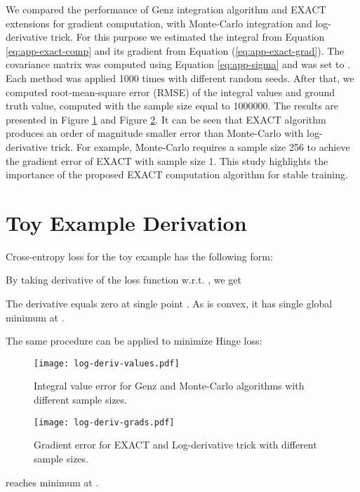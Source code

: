 \documentclass[nohyperref]{article}
\theoremstyle{plain}
\theoremstyle{definition}
\theoremstyle{remark}
\begin{document}
We compared the performance of Genz integration algorithm \cite{genz1992numerical} and EXACT extensions for gradient computation, with Monte-Carlo integration and log-derivative trick. For this purpose we estimated the integral from Equation \ref{eq:app-exact-comp} and its gradient from Equation (\ref{eq:app-exact-grad}). The covariance matrix  was computed using Equation \ref{eq:app-sigma} and  was set to . Each method was applied 1000 times with different random seeds. After that, we computed root-mean-square error (RMSE) of the integral values and ground truth value, computed with the sample size equal to 1000000.
The results are presented in Figure \ref{fig:mc_vs_genz_val} and Figure \ref{fig:mc_vs_genz_grad}. It can be seen that EXACT algorithm produces an order of magnitude smaller error than Monte-Carlo with log-derivative trick. For example, Monte-Carlo requires a sample size 256 to achieve the gradient error of EXACT with sample size 1. This study highlights the importance of the proposed EXACT computation algorithm for stable training.



\section{Toy Example Derivation}\label{app:toy}
Cross-entropy loss for the toy example has the following form:

By taking derivative of the loss function w.r.t. , we get

The derivative equals zero at single point . As  is convex, it has single global minimum at .

The same procedure can be applied to minimize Hinge loss:




\begin{figure}[t]
\centering
\texttt{[image: log-deriv-values.pdf]}
\caption{Integral value error for Genz and Monte-Carlo algorithms with different sample sizes.}
\label{fig:mc_vs_genz_val}
\vskip -0.2in
\end{figure}

\begin{figure}[t]
\centering
\texttt{[image: log-deriv-grads.pdf]}
\caption{Gradient error for EXACT and Log-derivative trick with different sample sizes.}
\label{fig:mc_vs_genz_grad}
\vskip -0in
\end{figure}


 reaches minimum at .
\end{document}
